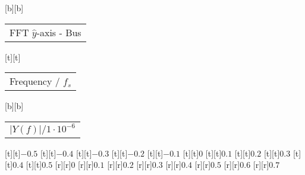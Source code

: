 %
[b][b]{\fontsize{8}{12}\selectfont \setlength{\tabcolsep}{0pt}\begin{tabular}{c}FFT $\hat{y}$-axis - Bus\end{tabular}}%
[t][t]{\fontsize{8}{12}\selectfont \setlength{\tabcolsep}{0pt}\begin{tabular}{c}Frequency / $f_s$\end{tabular}}%
[b][b]{\fontsize{8}{12}\selectfont \setlength{\tabcolsep}{0pt}\begin{tabular}{c}$\vert{}Y(f)\vert{}/1\cdot{}10^{-6}$\end{tabular}}%
%
\fontsize{6}{8}%
\selectfont%
%
[t][t]{$-0.5$}%
[t][t]{$-0.4$}%
[t][t]{$-0.3$}%
[t][t]{$-0.2$}%
[t][t]{$-0.1$}%
[t][t]{$0$}%
[t][t]{$0.1$}%
[t][t]{$0.2$}%
[t][t]{$0.3$}%
[t][t]{$0.4$}%
[t][t]{$0.5$}%
%
[r][r]{$0$}%
[r][r]{$0.1$}%
[r][r]{$0.2$}%
[r][r]{$0.3$}%
[r][r]{$0.4$}%
[r][r]{$0.5$}%
[r][r]{$0.6$}%
[r][r]{$0.7$}%
%
%
